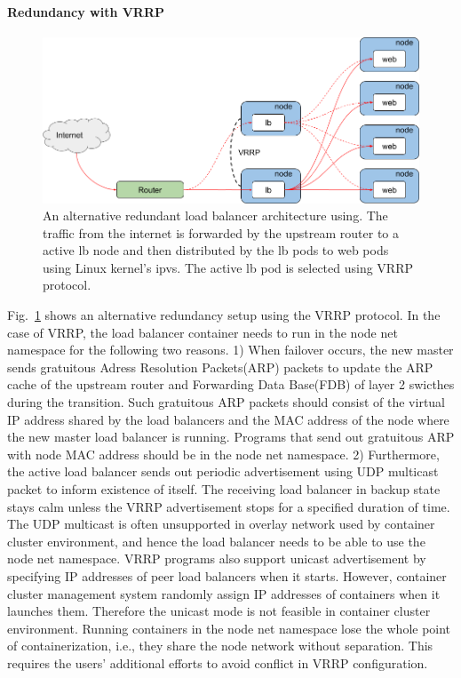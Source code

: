 \paragraph{\bf Redundancy with VRRP}

\begin{figure}[tb]
\begin{center}
\includegraphics[width=\columnwidth]{Figs/vrrp.png}
\end{center}
\caption{
  An alternative redundant load balancer architecture using.
  The traffic from the internet is forwarded by the upstream router to a active lb node and then distributed by the lb pods to web pods using Linux kernel's ipvs.
  The active lb pod is selected using VRRP protocol.
}
\label{fig:vrrp}
\end{figure}

Fig.~\ref{fig:vrrp} shows an alternative redundancy setup using the VRRP protocol.
In the case of VRRP, the load balancer container needs to run in the node net namespace for the following two reasons.
1) When failover occurs, the new master sends gratuitous Adress Resolution Packets(ARP) packets to update the ARP cache of the upstream router and Forwarding Data Base(FDB) of layer 2 swicthes during the transition.
Such gratuitous ARP packets should consist of the virtual IP address shared by the load balancers and the MAC address of the node where the new master load balancer is running.
Programs that send out gratuitous ARP with node MAC address should be in the node net namespace.
%
2) Furthermore, the active load balancer sends out periodic advertisement using UDP multicast packet to inform existence of itself.
The receiving load balancer in backup state stays calm unless the VRRP advertisement stops for a specified duration of time.
The UDP multicast is often unsupported in overlay network used by container cluster environment, and hence the load balancer needs to be able to use the node net namespace.
%
VRRP programs also support unicast advertisement by specifying IP addresses of peer load balancers when it starts.
However, container cluster management system randomly assign IP addresses of containers when it launches them.
Therefore the unicast mode is not feasible in container cluster environment.
%
Running containers in the node net namespace lose the whole point of containerization, i.e., they share the node network without separation.
This requires the users' additional efforts to avoid conflict in VRRP configuration.

